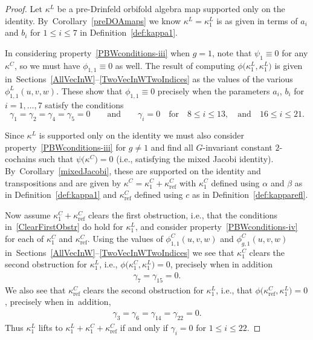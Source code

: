 \documentclass[pdftex]{sigma}
\numberwithin{equation}{section}
\DeclareMathOperator{\refl}{ref}
\begin{document}
\begin{proof}
Let $\kappa^L$ be a pre-Drinfeld orbifold algebra map supported only on the
identity. By~Corollary~\ref{preDOAmaps} we know $\kappa^L=\kappa^L_1$ is as given
in terms of $a_i$ and $b_i$ for $1 \leq i \leq 7$ in Definition~\ref{def:kappa1}.

In considering property~\eqref{PBWconditions-iii} when $g=1$, note that
$\psi_1 \equiv 0$ for any $\kappa^C$, so we must have $\phi_{1,1}\equiv 0$ as well.
The result of computing $\phi\big(\kappa^L_1,\kappa^L_1\big)$ is given
in~Sections~\ref{AllVecInW}--\ref{TwoVecInWTwoIndices} as the
values of the various $\phi^L_{1,1}(u,v,w)$.
These show that $\phi_{1,1}\equiv 0$
precisely when the parameters $a_i$, $b_i$ for $i=1,\dots,7$
satisfy the conditions
\begin{equation}
\label{ClearFirstObstr}
\gamma_1=\gamma_2=\gamma_4=\gamma_5=0\qquad \text{and}\qquad
\gamma_i=0 \quad \text{for}\quad 8\leq i \leq 13,\quad \text{and}\quad 16\leq i \leq 21.
\end{equation}

Since $\kappa^L$ is supported only on the identity we must also consider
property~\eqref{PBWconditions-iii} for $g \neq 1$ and find all
$G$-invariant constant $2$-cochains such that $\psi\big(\kappa^C\big)=0$
(i.e., satisfying the mixed Jacobi identity). By~Corollary~\ref{mixedJacobi}, these are
supported on the identity and transpositions and are given by
$\kappa^C=\kappa^C_1+\kappa^C_{\refl}$ with $\kappa^C_1$ defined using $\alpha$
and $\beta$ as in Definition~\ref{def:kappa1} and $\kappa^C_{\refl}$
defined using $c$ as in Definition~\ref{def:kapparefl}.

Now assume $\kappa^C_1+\kappa^C_{\refl}$ clears the first obstruction, i.e.,
that the conditions in~\eqref{ClearFirstObstr} do hold for $\kappa^L_1$, and
consider property~\eqref{PBWconditions-iv} for each of $\kappa^C_1$
and $\kappa^C_{\refl}$. Using the values of $\phi^C_{1,1}(u,v,w)$ and $\phi^C_{g,1}(u,v,w)$ in~Sections~\ref{AllVecInW}--\ref{TwoVecInWTwoIndices} we see that
$\kappa^C_1$ clears the second obstruction for $\kappa^L_1$,
i.e., $\phi\big(\kappa^C_1,\kappa^L_1\big)=0$,
precisely when in addition
\begin{gather}\label{ClearSecondObstr1C}
\gamma_7=\gamma_{15}=0.
\end{gather}
We also see that $\kappa^C_{\refl}$ clears the second obstruction for $\kappa^L_1$,
i.e., that $\phi\big(\kappa^C_{\refl},\kappa^L_1\big)=0$,
precisely when in~addition,
\begin{gather}
\label{ClearSecondObstr1Ref}
\gamma_3=\gamma_6=\gamma_{14}=\gamma_{22}=0.
\end{gather}
Thus $\kappa^L_1$ lifts to $\kappa^L_1+\kappa^C_1+\kappa^C_{\refl}$ if and
only if $\gamma_i=0$ for $1 \leq i \leq 22$.
\end{proof}
\end{document}
